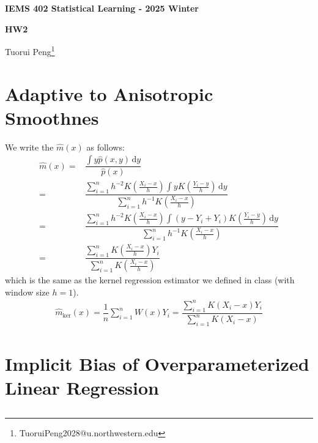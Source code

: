 \documentclass[11pt,a4paper]{ctexart}
\numberwithin{equation}{section}%
\begin{document}
\begin{center}\thispagestyle{plain}

{\LARGE\textbf{IEMS 402 Statistical Learning - 2025 Winter}}

{\Large\textbf{HW2}}

Tuorui Peng\footnote{TuoruiPeng2028@u.northwestern.edu}
\end{center}

\thispagestyle{myheadings}
\pagestyle{myheadings}




\section{Adaptive to Anisotropic Smoothnes}



We write the $ \hat{m}(x) $ as follows:
\begin{align*}
    \hat{m}(x)=&\dfrac{ \int y\hat{p}(x,y)\,\mathrm{d}y }{ \hat{p}(x) }\\
    =& \dfrac{ \sum_{i=1}^n h^{-2} K(\frac{X_i-x}{h}) \int yK(\frac{Y_i-y}{h})\,\mathrm{d}y }{ \sum_{i=1}^n h^{-1} K(\frac{X_i-x}{h}) }\\
    =& \dfrac{ \sum_{i=1}^n h^{-2} K(\frac{X_i-x}{h}) \int (y-Y_i+Y_i)K(\frac{Y_i-y}{h})\,\mathrm{d}y }{ \sum_{i=1}^n h^{-1} K(\frac{X_i-x}{h}) }\\
    =& \dfrac{ \sum_{i=1}^n  K(\frac{X_i-x}{h}) Y_i }{ \sum_{i=1}^n K(\frac{X_i-x}{h}) }
\end{align*}
which is the same as the kernel regression estimator we defined in class (with window size $ h = 1 $).
\begin{align*}
    \hat{m}_\mathrm{ ker }(x)=   \dfrac{ 1 }{ n }\sum_{i=1}^n W(x)Y_i = \dfrac{ \sum_{i=1}^n K(X_i-x)Y_i }{ \sum_{i=1}^n K(X_i-x) }   
\end{align*}

\section{Implicit Bias of Overparameterized Linear Regression}

\subsection{}
\end{document}
